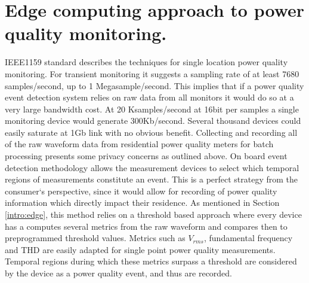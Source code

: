 \section{Edge computing approach to power quality monitoring.}

IEEE1159 standard describes the techniques for single location power quality monitoring. For transient monitoring it suggests a sampling rate of at least 7680 samples/second, up to 1 Megasample/second. This implies that if a power quality event detection system relies on raw data from all monitors it would do so at a very large bandwidth cost. At 20 Ksamples/second at 16bit per samples a single monitoring device would generate 300Kb/second. Several thousand devices could easily saturate at 1Gb link with no obvious benefit. Collecting and recording all of the raw waveform data from residential power quality meters for batch processing presents some privacy concerns as outlined above. On board event detection methodology allows the measurement devices to select which temporal regions of measurements constitute an event. This is a perfect strategy from the consumer`s perspective, since it would allow for recording of power quality information which directly impact their residence. As mentioned in Section \ref{intro:edge}, this method relies on a threshold based approach where every device has a computes several metrics from the raw waveform and compares then to preprogrammed threshold values. Metrics such as $V_{rms}$, fundamental frequency and THD are easily adapted for single point power quality measurements. Temporal regions during which these metrics surpass a threshold are considered by the device as a power quality event, and thus are recorded. 

